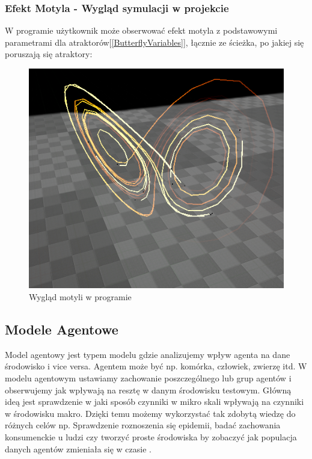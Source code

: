 \documentclass[a4paper,12pt,reqno]{article}
\begin{document}
\subsubsection{Efekt Motyla - Wygląd symulacji w projekcie}
{\color{blue}
W programie użytkownik może obserwować efekt motyla z podstawowymi parametrami dla atraktorów[\ref{ButterflyVariables}], łącznie ze ścieżka, po jakiej się poruszają się atraktory:

\begin{figure}[H]%
\centering
\includegraphics[width=0.7\columnwidth]{graphics/butterfly/ButterflyInUE_1.png}
\caption{Wygląd motyli w programie
\label{ButterflyEffectUE4}}%
%
\qquad
\end{figure}  
}
\newpage
\subsection{Modele Agentowe}

Model agentowy jest typem modelu gdzie analizujemy wpływ agenta na dane środowisko i vice versa. Agentem może być np. komórka, człowiek, zwierzę itd. W modelu agentowym ustawiamy zachowanie poszczególnego lub grup agentów i obserwujemy jak wpływają na resztę w danym środowisku testowym. Główną ideą jest sprawdzenie w jaki sposób czynniki w mikro skali wpływają na czynniki w środowisku makro. Dzięki temu możemy wykorzystać tak zdobytą wiedzę do różnych celów np. Sprawdzenie roznoszenia się epidemii, badać zachowania konsumenckie u ludzi czy tworzyć proste środowiska  by zobaczyć jak populacja danych agentów zmieniała się w czasie \cite{agent_examples}. 
\end{document}

